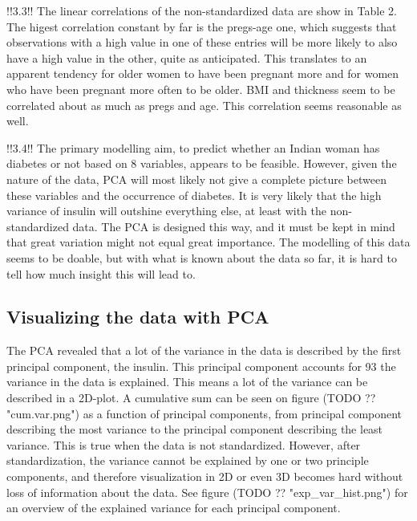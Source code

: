 !!3.3!!
The linear correlations of the non-standardized data are show in Table 2.
The higest correlation constant by far is the pregs-age one, which suggests
that observations with a high value in one of these entries will be more likely
to also have a high value in the other, quite as anticipated. This translates to
an apparent tendency for older women to have been pregnant more and for women
who have been pregnant more often to be older.
BMI and thickness seem to be correlated about as much as pregs and age. This
correlation seems reasonable as well.

!!3.4!!
The primary modelling aim, to predict whether an Indian woman has diabetes or not
based on 8 variables, appears to be feasible. However, given the nature of the
data, PCA will most likely not give a complete picture between these variables
and the occurrence of diabetes. It is very likely that the high variance of
insulin will outshine everything else, at least with the non-standardized
data. The PCA is designed this way, and it must be kept in mind that great
variation might not equal great importance.
The modelling of this data seems to be doable, but with what is known about the data
so far, it is hard to tell how much insight this will lead to.

\subsection{Visualizing the data with PCA}

The PCA revealed that a lot of the variance in the data is described by the
first principal component, the insulin. This principal component accounts for
93%
the variance in the data is explained. This means a lot of the variance can
be described in a 2D-plot. A cumulative sum can be seen on figure (TODO ?? "cum.var.png") as a
function of principal components, from principal component describing the most
variance to the principal component describing the least variance. This is true
when the data is not standardized. However, after standardization, the variance
cannot be explained by one or two principle components, and therefore visualization
in 2D or even 3D becomes hard without loss of information about the data. See figure
(TODO ?? "exp\_var\_hist.png") for an overview of the explained variance for each principal component.

